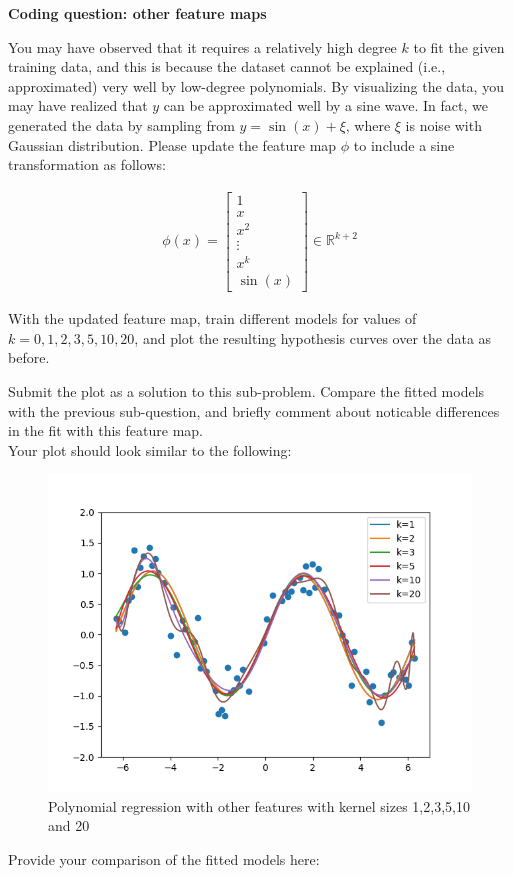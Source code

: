 \item {} {\bf Coding question: other feature maps}

You may have observed that it requires a relatively high degree $k$ to fit the given training data, and this is because the dataset cannot be explained (i.e., approximated) very well by low-degree polynomials. By visualizing the data, you may have realized that $y$ can be approximated well by a sine wave. In fact, we generated the data by sampling from $y = \sin(x) + \xi$, where $\xi$ is noise with Gaussian distribution. Please update the feature map $\phi$ to include a sine transformation as follows:

\begin{align}
\phi(x) = \left[\begin{array}{c} 1\\ x \\ x^2\\ \vdots \\x^k \\ \sin(x) \end{array}\right]\in \mathbb{R}^{k+2} \label{eqn:feature-sine}
\end{align}

With the updated feature map, train different models for values of $k=0,1,2,3,5,10,20$, and plot the resulting hypothesis curves over the data as before.

Submit the plot as a solution to this sub-problem. Compare the fitted models with the previous sub-question, and briefly comment about noticable differences in the fit with this feature map.\\

Your plot should look similar to the following:
\begin{figure}[H]
  \centering
  \includegraphics[width=0.65\linewidth]{featuremaps/src/large-sine.png}
  \centering
\caption{Polynomial regression with other features with kernel sizes 1,2,3,5,10 and 20}
\end{figure}

Provide your comparison of the fitted models here:\\[50pt]